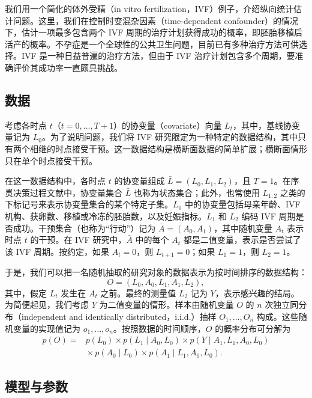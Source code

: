我们用一个简化的体外受精（in vitro fertilization，IVF）例子，介绍纵向统计估计问题。这里，我们在控制时变混杂因素（time-dependent confounder）的情况下，估计一项最多包含两个 IVF 周期的治疗计划获得成功的概率，即胚胎移植后活产的概率。不孕症是一个全球性的公共卫生问题，目前已有多种治疗方法可供选择。IVF 是一种日益普遍的治疗方法，但由于 IVF 治疗计划包含多个周期，要准确评价其成功率一直颇具挑战。

\subsection{数据}
\label{subsec:ch01-data}

考虑各时点 $t$（$t=0,\ldots,T+1$）的协变量（covariate）向量 $L_t$，其中，基线协变量记为 $L_0$。为了说明问题，我们将 IVF 研究限定为一种特定的数据结构，其中只有两个相继的时点接受干预。这一数据结构是横断面数据的简单扩展；横断面情形只在单个时点接受干预。

在这一数据结构中，各时点 $t$ 的协变量组成 $\bar L=(L_0,L_1,L_2)$，且 $T=1$。在序贯决策过程文献中，协变量集合 $\bar L$ 也称为状态集合；此外，也常使用 $L_{1:2}$ 之类的下标记号来表示协变量集合的某个特定子集。$L_0$ 中的协变量包括母亲年龄、IVF 机构、获卵数、移植或冷冻的胚胎数，以及妊娠指标。$L_1$ 和 $L_2$ 编码 IVF 周期是否成功。干预集合（也称为“行动”）记为 $\bar A=(A_0,A_1)$，其中随机变量 $A_t$ 表示时点 $t$ 的干预。在 IVF 研究中，$\bar A$ 中的每个 $A_t$ 都是二值变量，表示是否尝试了该 IVF 周期。按约定，如果 $A_t=0$，则 $L_{t+1}=0$；如果 $L_1=1$，则 $L_2=1$。

于是，我们可以把一名随机抽取的研究对象的数据表示为按时间排序的数据结构：
\[
 O=(L_0,A_0,L_1,A_1,L_2),
\]
其中，假定 $L_t$ 发生在 $A_t$ 之前。最终的测量值 $L_2$ 记为 $Y$，表示感兴趣的结局。为简便起见，我们考虑 $Y$ 为二值变量的情形。样本由随机变量 $O$ 的 $n$ 次独立同分布（independent and identically distributed，i.i.d.）抽样 $O_1,\ldots,O_n$ 构成。这些随机变量的实现值记为 $o_1,\ldots,o_n$。按照数据的时间顺序，$O$ 的概率分布可分解为
\[
 \begin{aligned}
 p(O)={}&p(L_0)\times p(L_1\mid A_0,L_0)
                \times p(Y\mid A_1,L_1,A_0,L_0)\\
        &{}\times p(A_0\mid L_0)\times p(A_1\mid L_1,A_0,L_0).
 \end{aligned}
\]

\subsection{模型与参数}
\label{subsec:ch01-model-parameter}

